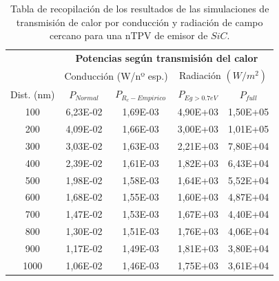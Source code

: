 \begin{table}[H]
	\centering
	\caption{Tabla de recopilación de los resultados de las simulaciones de transmisión de calor por conducción y radiación de campo cercano para una nTPV de emisor de $SiC$.}
		\begin{tabular}{|c||c|c||c|c|}
		\hline
\multirow{2}{*}{ }& \multicolumn{4}{c|}{\textbf{\large Potencias según transmisión del calor}}\\ \cline{2-5}
& \multicolumn{2}{c||}{Conducción (W/nº esp.)}& \multicolumn{2}{c|}{Radiación $(W/m^2)$}\\ \hline
Dist. (nm)&$P_{Normal}$&$P_{R_c-Empirico}$&$P_{Eg>0.7eV}$&$P_{full}$\\ \hline \hline
100&6,23E-02&1,69E-03&4,90E+03&1,50E+05\\ \hline 
200&4,09E-02&1,66E-03&3,00E+03&1,01E+05\\ \hline 
300&3,03E-02&1,63E-03&2,21E+03&7,80E+04\\ \hline 
400&2,39E-02&1,61E-03&1,82E+03&6,43E+04\\ \hline 
500&1,98E-02&1,58E-03&1,64E+03&5,52E+04\\ \hline 
600&1,68E-02&1,55E-03&1,60E+03&4,87E+04\\ \hline 
700&1,47E-02&1,53E-03&1,67E+03&4,40E+04\\ \hline 
800&1,30E-02&1,51E-03&1,76E+03&4,06E+04\\ \hline 
900&1,17E-02&1,49E-03&1,81E+03&3,80E+04\\ \hline 
1000&1,06E-02&1,46E-03&1,75E+03&3,61E+04\\ \hline 
		\end{tabular}
	\label{tab:SiCSiO2Ge}
\end{table}

\vfill \newpage
